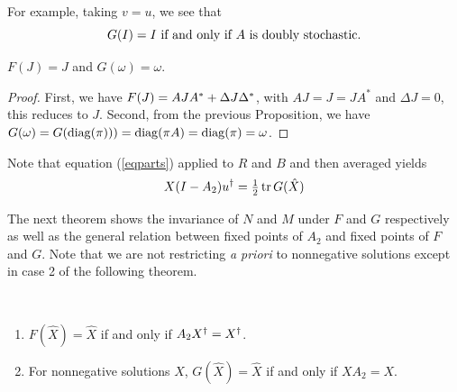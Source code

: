 For example, taking $v=u$, we see that 
$$
  G(I)=I \ \hbox{if and only if}\  A \ 
	\hbox{is doubly stochastic.}
$$

\begin{proposition}  	\label{prop:7.9}  %
$F(J)=J$ and $G(\omega)=\omega$.
\end{proposition}

\begin{proof}
First, we have $F(J)={A}{J}{A}^*+{\Delta}{J}{\Delta}^*$, with $AJ=J=JA^*$ and $\Delta J=0$, this reduces to $J$.
Second, from the previous Proposition, we have $G(\omega)=G({\rm diag}({\pi})))={\rm diag}({\pi A})={\rm diag}({\pi})=\omega$.
\end{proof}

Note that equation (\ref{eqparts}) applied to $R$ and $B$ and then averaged yields
%
\begin{equation} \label{eqPTS}
  X(I-A_2)\dg  u. =\half\,\tr G(\hat X)
\end{equation}
%

The next theorem shows the invariance of $N$ and $M$ under $F$ and $G$ respectively as well as the general relation between
fixed points of $A_2$ and fixed points of $F$ and $G$. 
Note that we are not restricting {\it a priori\/} to nonnegative solutions except in case 2 of the following theorem.

\begin{theorem}   \label{thm:7.2}  \hfill \\[-8pt]
\begin{enumerate}
\item[{\normalfont 1.}] $F(\hat X)=\hat X$ if and only if $A_2\dg  X.=\dg  X.$.

\item[{\normalfont 2.}] For nonnegative solutions $X$, $G(\hat X)=\hat X$ if and only if $XA_2=X$.
\end{enumerate}
\end{theorem}

